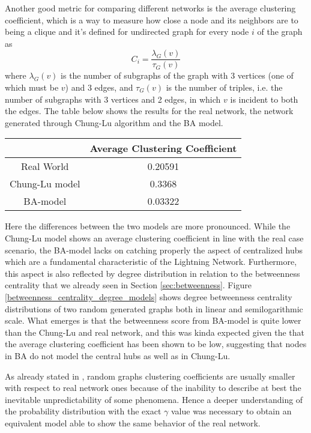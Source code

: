 	Another good metric for comparing different networks is the average clustering coefficient, which is a way to measure how close a node and its neighbors are to being a clique and it's defined for undirected graph for every node $i$ of the graph as $$C_i = \frac{\lambda_G(v)}{\tau_G(v)}$$ where $\lambda_G(v)$ is the number of subgraphs of the graph with 3 vertices (one of which must be $v$) and 3 edges, and $\tau_G(v)$ is the number of triples, i.e. the number of subgraphs with 3 vertices and 2 edges, in which $v$ is incident to both the edges. The table below shows the results for the real network, the network generated through Chung-Lu algorithm and the BA model.
	\begin{center}
		\begin{tabulary}{0.75\linewidth}{| C | C |}
			\hline
			& Average Clustering Coefficient \\ \hline
			Real World & 0.20591 \\ \hline
			Chung-Lu model & 0.3368 \\ \hline
			BA-model & 0.03322 \\
			\hline
		\end{tabulary}
	\end{center}

	Here the differences between the two models are more pronounced. While the Chung-Lu model shows an average clustering coefficient in line with the real case scenario, the BA-model lacks on catching properly the aspect of centralized hubs which are a fundamental characteristic of the Lightning Network. Furthermore, this aspect is also reflected by degree distribution in relation to the betweenness centrality that we already seen in Section \ref{sec:betweenness}. Figure \ref{betweenness_centrality_degree_models} shows degree betweenness centrality distributions of two random generated graphs both in linear and semilogarithmic scale. What emerges is that the betweenness score from BA-model is quite lower than the Chung-Lu and real network, and this was kinda expected given the that the average clustering coefficient has been shown to be low, suggesting that nodes in BA do not model the central hubs as well as in Chung-Lu.
	
	As already stated in \cite{Watts1998}, random graphs clustering coefficients are usually smaller with respect to real network ones because of the inability to describe at best the inevitable unpredictability of some phenomena. Hence a deeper understanding of the probability distribution with the exact $\gamma$ value was necessary to obtain an equivalent model able to show the same behavior of the real network.
	
